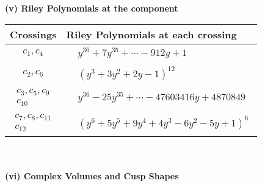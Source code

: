 \documentclass[1p]{elsarticle_modified}
\theoremstyle{definition}
\begin{document}
\newpage\renewcommand{\arraystretch}{1}
\flushleft \textbf{(v) Riley Polynomials at the component}\newline \\
\begin{tabular}{m{50pt}|m{274pt}}
Crossings & \hspace{64pt}Riley Polynomials at each crossing \\
\hline $$\begin{aligned}c_{1},c_{4}\end{aligned}$$&$\begin{aligned}
&y^{36}+7 y^{35}+\cdots-912 y+1
\end{aligned}$\\
\hline $$\begin{aligned}c_{2},c_{6}\end{aligned}$$&$\begin{aligned}
&(y^3+3 y^2+2 y-1)^{12}
\end{aligned}$\\
\hline $$\begin{aligned}c_{3},c_{5},c_{9}\\c_{10}\end{aligned}$$&$\begin{aligned}
&y^{36}-25 y^{35}+\cdots-47603416 y+4870849
\end{aligned}$\\
\hline $$\begin{aligned}c_{7},c_{8},c_{11}\\c_{12}\end{aligned}$$&$\begin{aligned}
&(y^6+5 y^5+9 y^4+4 y^3-6 y^2-5 y+1)^6
\end{aligned}$\\
\hline
\end{tabular}\\~\\
\newpage\flushleft \textbf{(vi) Complex Volumes and Cusp Shapes}
\end{document}
